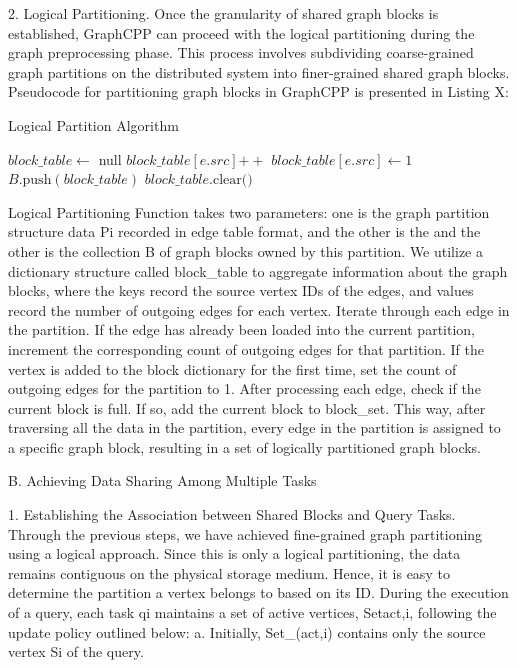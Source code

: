 \documentclass[lettersize,journal]{IEEEtran} %
\begin{document}
2. Logical Partitioning. Once the granularity of shared graph blocks is established, GraphCPP can proceed with the logical partitioning during the graph preprocessing phase. This process involves subdividing coarse-grained graph partitions on the distributed system into finer-grained shared graph blocks. Pseudocode for partitioning graph blocks in GraphCPP is presented in Listing X:

\begin{algorithm}
\caption{Logical Partition Algorithm}
\begin{algorithmic}[1]
 
    \State $block\_table \gets$ null
      
            \State $block\_table[e.src] \mathrel{+{+}}$
        \Else
            \State $block\_table[e.src] \gets 1$
        \EndIf
            \State $B.\text{push}(block\_table)$
            \State $block\_table.\text{clear()}$
        \EndIf
    \EndFor
\EndFunction
\end{algorithmic}
\end{algorithm}

Logical Partitioning Function takes two parameters: one is the graph partition structure data Pi recorded in edge table format, and the other is the and the other is the collection B of graph blocks owned by this partition.   We utilize a dictionary structure called block_table to aggregate information about the graph blocks, where the keys record the source vertex IDs of the edges, and values record the number of outgoing edges for each vertex. Iterate through each edge in the partition. If the edge has already been loaded into the current partition, increment the corresponding count of outgoing edges for that partition. If the vertex is added to the block dictionary for the first time, set the count of outgoing edges for the partition to 1. After processing each edge, check if the current block is full. If so, add the current block to block_set. This way, after traversing all the data in the partition, every edge in the partition is assigned to a specific graph block, resulting in a set of logically partitioned graph blocks.

B. Achieving Data Sharing Among Multiple Tasks

1. Establishing the Association between Shared Blocks and Query Tasks. Through the previous steps, we have achieved fine-grained graph partitioning using a logical approach. Since this is only a logical partitioning, the data remains contiguous on the physical storage medium. Hence, it is easy to determine the partition a vertex belongs to based on its ID. During the execution of a query, each task qi maintains a set of active vertices, Setact,i, following the update policy outlined below:
a. Initially, Set_(act,i) contains only the source vertex Si of the query.
\end{document}
